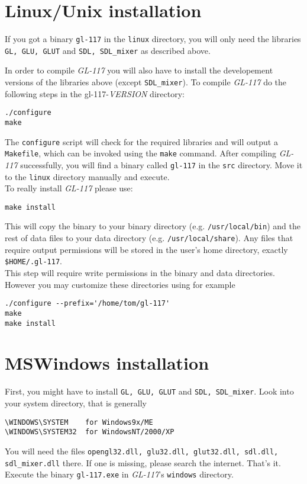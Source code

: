 \section{Linux/Unix installation}
\label{sec:linux_installation}

If you got a binary \texttt{gl-117} in the \texttt{linux} directory, you will only
need the libraries \texttt{GL, GLU, GLUT} and \texttt{SDL, SDL\_mixer} as
described above.

In order to compile \emph{GL-117} you will also have to install the developement
versions of the libraries above (except \texttt{SDL\_mixer}).
To compile \emph{GL-117} do the following steps in the gl-117-\textit{VERSION}
directory:
\begin{verbatim}
./configure
make
\end{verbatim}

The \texttt{configure} script will check for the required libraries and will output
a \texttt{Makefile}, which can be invoked using the \texttt{make} command.
After compiling \emph{GL-117} successfully, you will find a binary called \texttt{gl-117}
in the \texttt{src} directory. Move it to the \texttt{linux} directory manually and
execute.\\
To really install \emph{GL-117} please use:
\begin{verbatim}
make install
\end{verbatim}
This will copy the binary to your binary directory (e.g. \texttt{/usr/local/bin})
and the rest of data files to your data directory (e.g. \texttt{/usr/local/share}).
Any files that require output permissions will be stored in the user's home directory,
exactly \texttt{\$HOME/.gl-117}.\\
This step will require write permissions in the binary and data directories.
However you may customize these directories using for example
\begin{verbatim}
./configure --prefix='/home/tom/gl-117'
make
make install
\end{verbatim}


\section{MSWindows installation}
\label{sec:windows_installation}

First, you might have to install \texttt{GL, GLU, GLUT} and \texttt{SDL, SDL\_mixer}.
Look into your system directory, that is generally
\begin{verbatim}
\WINDOWS\SYSTEM    for Windows9x/ME
\WINDOWS\SYSTEM32  for WindowsNT/2000/XP
\end{verbatim}
You will need the files \texttt{opengl32.dll, glu32.dll, glut32.dll, sdl.dll, sdl\_mixer.dll}
there.
If one is missing, please search the internet.
That's it. Execute the binary \texttt{gl-117.exe} in \emph{GL-117}'s \texttt{windows}
directory.\\

